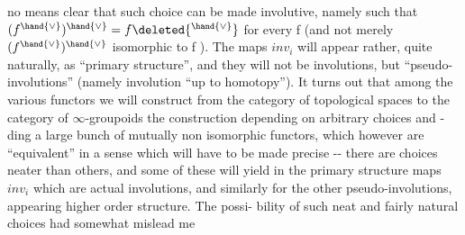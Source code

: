 no means clear that such choice can be made involutive, namely such that
$(f^{\hand{\vee}})^{\hand{\vee}} = f\deleted{^{\hand{\vee}}}$ for every f (and not merely $(f^{\hand{\vee}})^{\hand{\vee}}$ isomorphic to f ). The maps
$inv_i$ will appear rather, quite naturally, as ``primary structure'', and
they will not be involutions, but ``pseudo-involutions'' (namely involution
``up to homotopy''). It turns out that among the various functors  we will
construct\hand{,} from the category of topological spaces to the category of
$\infty$-groupoids\hand{(} the construction depending on arbitrary choices and -%
ding a large bunch of mutually non isomorphic functors, which however are
``equivalent'' in a sense which will have to be made precise -\hand{)}- there are
choices neater than others, and some of these will yield in the primary
structure maps $inv_i$ which are actual involutions, and similarly for the
other pseudo-involutions, appearing   higher order structure. The possi-%
bility of such neat and fairly natural choices had somewhat mislead me

